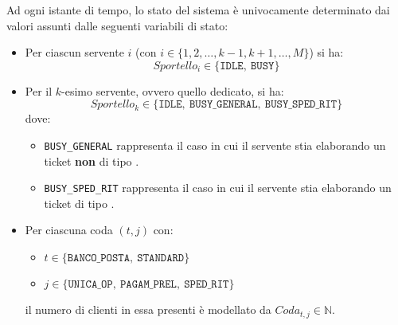 Ad ogni istante di tempo, lo stato del sistema è univocamente determinato dai valori assunti dalle seguenti variabili di stato:
\begin{itemize}
\item Per ciascun servente $i$ (con $i \in \lbrace 1, 2, \dots, k-1, k+1, \dots, M \rbrace$) si ha:
\begin{equation}
Sportello_i \in \lbrace \mathtt{IDLE},\ \mathtt{BUSY} \rbrace 
\end{equation}
\item Per il $k$-esimo servente, ovvero quello dedicato, si ha:
\begin{equation}
Sportello_k \in \lbrace \mathtt{IDLE},\ \mathtt{BUSY\_GENERAL},\ \mathtt{BUSY\_SPED\_RIT}\rbrace 
\end{equation}
dove:
\begin{itemize}
\item \texttt{BUSY\_GENERAL} rappresenta il caso in cui il servente stia elaborando un ticket \textbf{non} di tipo \sr{}.
\item \texttt{BUSY\_SPED\_RIT} rappresenta il caso in cui il servente stia elaborando un ticket di tipo \sr{}.
\end{itemize}
\item Per ciascuna coda $(t, j)$ con:
\begin{itemize}
\item $t \in \lbrace \mathtt{BANCO\_POSTA},\ \mathtt{STANDARD}\rbrace$
\item $j \in \lbrace \mathtt{UNICA\_OP},\ \mathtt{PAGAM\_PREL},\ \mathtt{SPED\_RIT} \rbrace$
\end{itemize}
il numero di clienti in essa presenti è modellato da $Coda_{t,j} \in \mathbb{N}$.
\end{itemize}
